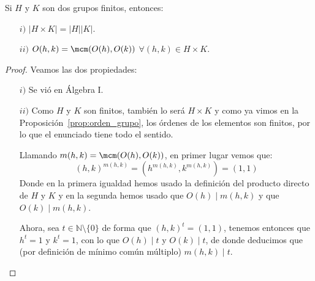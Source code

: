 \begin{prop}
    Si $H$ y $K$ son dos grupos finitos, entonces:
    \begin{enumerate}
        \item[$i)$] $|H\times K| = |H||K|$.
        \item[$ii)$] $O(h,k) = \mcm(O(h), O(k))$ $\forall (h,k)\in H\times K$.
    \end{enumerate}
    \begin{proof}
        Veamos las dos propiedades:
        \begin{enumerate}
            \item[$i)$] Se vió en Álgebra I.
            \item[$ii)$] Como $H$ y $K$ son finitos, también lo será $H\times K$ y como ya vimos en la Proposición~\ref{prop:orden_grupo}, los órdenes de los elementos son finitos, por lo que el enunciado tiene todo el sentido.

                Llamando $m(h,k) = \mcm(O(h),O(k))$, en primer lugar vemos que:
                \begin{equation*}
                    {(h,k)}^{m(h,k)} = \left(h^{m(h,k)},k^{m(h,k)}\right) = (1,1)
                \end{equation*}
                Donde en la primera igualdad hemos usado la definición del producto directo de $H$ y $K$ y en la segunda hemos usado que $O(h)\mid m(h,k)$ y que $O(k)\mid m(h,k)$.

                Ahora, sea $t\in \mathbb{N}\setminus\{0\}$ de forma que ${(h,k)}^{t} = (1,1)$, tenemos entonces que $h^t = 1$ y $k^t = 1$, con lo que $O(h) \mid t$ y $O(k)\mid t$, de donde deducimos que (por definición de mínimo común múltiplo) $m(h,k)\mid t$. \qedhere
        \end{enumerate} 
    \end{proof}
\end{prop}

